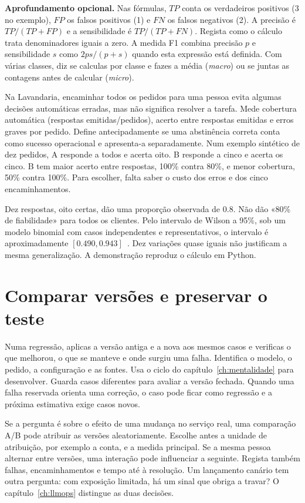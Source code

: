 \textbf{Aprofundamento opcional.} Nas fórmulas, $TP$ conta os verdadeiros positivos (3 no exemplo), $FP$ os falsos positivos (1) e $FN$ os falsos negativos (2). A precisão é $TP/(TP+FP)$ e a sensibilidade é $TP/(TP+FN)$. Regista como o cálculo trata denominadores iguais a zero. A medida F1 combina precisão $p$ e sensibilidade $s$ como $2ps/(p+s)$ quando esta expressão está definida. Com várias classes, diz se calculas por classe e fazes a média (\emph{macro}) ou se juntas as contagens antes de calcular (\emph{micro}).

Na Lavandaria, encaminhar todos os pedidos para uma pessoa evita algumas decisões automáticas erradas, mas não significa resolver a tarefa. Mede cobertura automática (respostas emitidas/pedidos), acerto entre respostas emitidas e erros graves por pedido. Define antecipadamente se uma abstinência correta conta como sucesso operacional e apresenta-a separadamente. Num exemplo sintético de dez pedidos, A responde a todos e acerta oito. B responde a cinco e acerta os cinco. B tem maior acerto entre respostas, 100\% contra 80\%, e menor cobertura, 50\% contra 100\%. Para escolher, falta saber o custo dos erros e dos cinco encaminhamentos.

Dez respostas, oito certas, dão uma proporção observada de $0.8$. Não dão «80\% de fiabilidade» para todos os clientes. Pelo intervalo de Wilson a 95\%, sob um modelo binomial com casos independentes e representativos, o intervalo é aproximadamente $[0.490,0.943]$~\citep{wilson1927}. Dez variações quase iguais não justificam a mesma generalização. A demonstração reproduz o cálculo em Python.

\section{Comparar versões e preservar o teste}

Numa regressão, aplicas a versão antiga e a nova aos mesmos casos e verificas o que melhorou, o que se manteve e onde surgiu uma falha. Identifica o modelo, o pedido, a configuração e as fontes. Usa o ciclo do capítulo~\ref{ch:mentalidade} para desenvolver. Guarda casos diferentes para avaliar a versão fechada. Quando uma falha reservada orienta uma correção, o caso pode ficar como regressão e a próxima estimativa exige casos novos.

Se a pergunta é sobre o efeito de uma mudança no serviço real, uma comparação A/B pode atribuir as versões aleatoriamente. Escolhe antes a unidade de atribuição, por exemplo a conta, e a medida principal. Se a mesma pessoa alternar entre versões, uma interação pode influenciar a seguinte. Regista também falhas, encaminhamentos e tempo até à resolução. Um lançamento canário tem outra pergunta: com exposição limitada, há um sinal que obriga a travar? O capítulo~\ref{ch:llmops} distingue as duas decisões.

